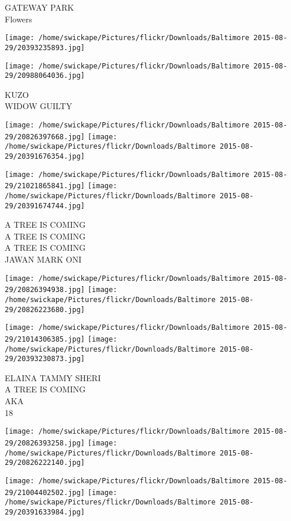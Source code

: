 \documentclass[10pt,letterpaper]{article}
\begin{document}
GATEWAY PARK\\
Flowers\\
\pagebreak

\texttt{[image: /home/swickape/Pictures/flickr/Downloads/Baltimore 2015-08-29/20393235893.jpg]}

\vspace{0.25in}
\texttt{[image: /home/swickape/Pictures/flickr/Downloads/Baltimore 2015-08-29/20988064036.jpg]}

KUZO\\
WIDOW GUILTY\\
\pagebreak

\texttt{[image: /home/swickape/Pictures/flickr/Downloads/Baltimore 2015-08-29/20826397668.jpg]}
\texttt{[image: /home/swickape/Pictures/flickr/Downloads/Baltimore 2015-08-29/20391676354.jpg]}

\texttt{[image: /home/swickape/Pictures/flickr/Downloads/Baltimore 2015-08-29/21021865841.jpg]}
\texttt{[image: /home/swickape/Pictures/flickr/Downloads/Baltimore 2015-08-29/20391674744.jpg]}

A TREE IS COMING\\
A TREE IS COMING\\
A TREE IS COMING\\
JAWAN MARK ONI\\
\pagebreak

\texttt{[image: /home/swickape/Pictures/flickr/Downloads/Baltimore 2015-08-29/20826394938.jpg]}
\texttt{[image: /home/swickape/Pictures/flickr/Downloads/Baltimore 2015-08-29/20826223680.jpg]}

\texttt{[image: /home/swickape/Pictures/flickr/Downloads/Baltimore 2015-08-29/21014306385.jpg]}
\texttt{[image: /home/swickape/Pictures/flickr/Downloads/Baltimore 2015-08-29/20393230873.jpg]}

ELAINA TAMMY SHERI\\
A TREE IS COMING\\
AKA\\
18\\
\pagebreak

\texttt{[image: /home/swickape/Pictures/flickr/Downloads/Baltimore 2015-08-29/20826393258.jpg]}
\texttt{[image: /home/swickape/Pictures/flickr/Downloads/Baltimore 2015-08-29/20826222140.jpg]}

\texttt{[image: /home/swickape/Pictures/flickr/Downloads/Baltimore 2015-08-29/21004402502.jpg]}
\texttt{[image: /home/swickape/Pictures/flickr/Downloads/Baltimore 2015-08-29/20391633984.jpg]}
\end{document}
